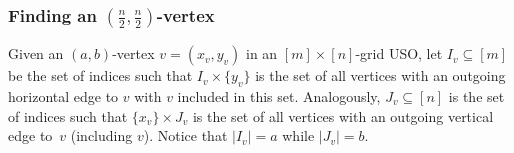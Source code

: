 \documentclass[runningheads,a4paper]{llncs}
\begin{document}
% 
% 

\subsubsection{Finding an $(\frac{n}{2}, \frac{n}{2})$-vertex}

Given an $(a, b)$-vertex $v = (x_v, y_v)$ in an $[m]\times [n]$-grid USO, let $I_v\subseteq [m]$ be the set of indices such that  $I_v \times \{y_v\}$ is the set of all vertices with an outgoing horizontal edge to $v$ with $v$ included in this set. Analogously, $J_v\subseteq [n]$ is the set of indices such that $\{x_v\}\times J_v$ is the set of all vertices with an outgoing vertical edge to~$v$ (including $v$). Notice that $|I_v| = a$ while $|J_v| = b$.
\end{document}
